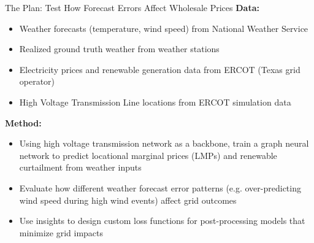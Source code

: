 \documentclass[aspectratio=169, xcolor=dvipsnames]{beamer}
\begin{document}
\begin{frame}{The Plan: Test How Forecast Errors Affect Wholesale Prices}
    \textbf{Data:}
    \begin{itemize}
        \item Weather forecasts (temperature, wind speed) from National Weather Service
        \item Realized ground truth weather from weather stations
        \item Electricity prices and renewable generation data from ERCOT (Texas grid operator)
        \item High Voltage Transmission Line locations from ERCOT simulation data
    \end{itemize}

    \vspace{0.3cm}
    \textbf{Method:}
    \begin{itemize}
        \item Using high voltage transmission network as a backbone, train a graph neural network to predict locational marginal prices (LMPs) and renewable curtailment from weather inputs
        \item Evaluate how different weather forecast error patterns (e.g. over-predicting wind speed during high wind events) affect grid outcomes
        \item Use insights to design custom loss functions for post-processing models that minimize grid impacts
    \end{itemize}
\end{frame}
\end{document}
